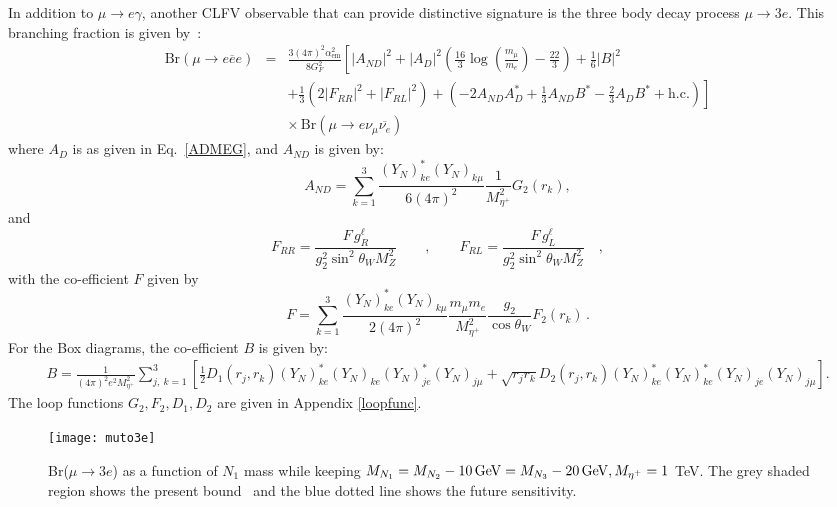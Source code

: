 \documentclass[prd,nofootinbib,preprint,superscriptaddress]{revtex4}
\begin{document}
	
	In addition to $\mu\to e\gamma$, another CLFV observable that can provide distinctive signature is the three body decay process $\mu \to 3e $. This branching fraction is given by~\cite{Toma:2013zsa}:
\begin{eqnarray}
	\text{Br}\left(\mu \to
	e \overline{e}e\right)&=&
	\frac{3(4\pi)^2\alpha_{\mathrm{em}}^2}{8G_F^2}
	\left[|A_{ND}|^2
	+|A_D|^2\left(\frac{16}{3}\log\left(\frac{m_\mu}{m_e}\right)
	-\frac{22}{3}\right)+\frac{1}{6}|B|^2\right.\nonumber\\
	&&\left.+ \frac{1}{3} \left( 2  |F_{RR}|^2 + |F_{RL}|^2 \right)
	+\left(-2 A_{ND} A_D^{*}+\frac{1}{3}A_{ND} B^*
	-\frac{2}{3}A_D B^*+\mathrm{h.c.}\right)\right]\nonumber\\
	&&\times \, \mathrm{Br}\left(\mu \to e\nu_{\mu}
	\overline{\nu_e}\right) \,  \label{eq:l3lBR}
\end{eqnarray}
where $A_D$ is as given in Eq.~\ref{ADMEG}, and $A_{ND}$ is given by:
\begin{equation}
	A_{ND}=\sum_{k=1}^3\frac{(Y_N)^*_{ke} (Y_N)_{k\mu}}
	{6(4\pi)^2}\frac{1}{M_{\eta^+}^2}
	G_2\left(r_k\right), \label{eq:A1L}
\end{equation}
and 
\begin{equation}
	F_{RR} = \frac{F \, g_R^\ell}{g_2^2 \sin^2 \theta_W M_Z^2} \qquad ,
	\qquad F_{RL} = \frac{F \, g_L^\ell}{g_2^2 \sin^2 \theta_W M_Z^2} \quad,
\end{equation}
with the co-efficient $F$ given by
\begin{equation}
	F = \sum_{k=1}^3\frac{(Y_N)^*_{ke} (Y_N)_{k\mu}}
	{2(4\pi)^2}\frac{m_\mu m_e}{M_{\eta^+}^2} \frac{g_2}{\cos \theta_W}
	F_2\left(r_k\right) \, .
	\label{eq:FR}
\end{equation}
For the Box diagrams, the co-efficient $B$ is given by:
{\small \begin{align}
	 B = \frac{1}{(4\pi)^2 e^2 M_{\eta^+}^2} 
	\sum_{j,\:k=1}^3\left[\frac{1}{2} D_1(r_j,r_k) (Y_N)_{k e}^* (Y_N)_{k e}
	(Y_N)_{j e}^* (Y_N)_{j \mu} + \sqrt{r_j r_k}
	D_2(r_j,r_k) (Y_N)_{k e}^* (Y_N)_{k e}^* (Y_N)_{je}
	(Y_N)_{j \mu}\right].
\end{align}}
The loop functions $G_2, F_2, D_1, D_2$ are given in Appendix \ref{loopfunc}.
\begin{figure}[h!]
	\centering
	\texttt{[image: muto3e]}
	\caption{Br($\mu \to 3 e$) as a function of $N_1$ mass while keeping $M_{N_1}=M_{N_2}-10 \, {\rm GeV} = M_{N_3}-20 \, {\rm GeV}, M_{\eta^+} = 1$ TeV. The grey shaded region shows the present bound~\cite{SINDRUM:1987nra} and the blue dotted line shows the future sensitivity.~\cite{Baldini:2018uhj}}
	\label{muto3e}
\end{figure}
\end{document}
